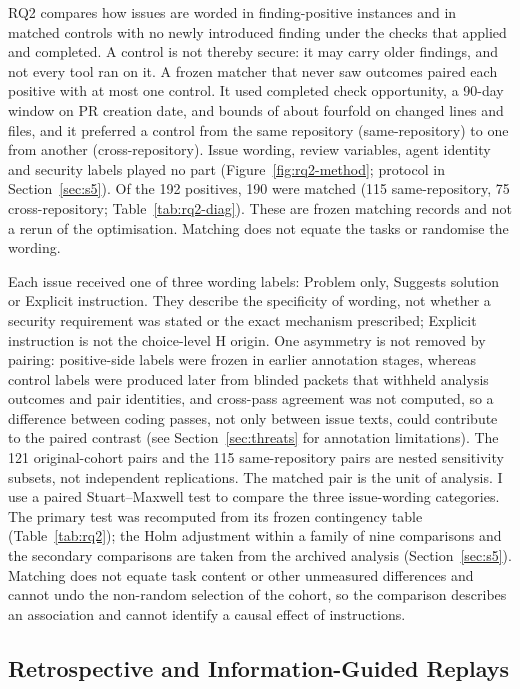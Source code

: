 \documentclass[acmsmall,screen,nonacm]{acmart}
\begin{document}
RQ2 compares how issues are worded in finding-positive instances and in matched controls with no newly introduced finding under the checks that applied and completed. A control is not thereby secure: it may carry older findings, and not every tool ran on it. A frozen matcher that never saw outcomes paired each positive with at most one control. It used completed check opportunity, a 90-day window on PR creation date, and bounds of about fourfold on changed lines and files, and it preferred a control from the same repository (same-repository) to one from another (cross-repository). Issue wording, review variables, agent identity and security labels played no part (Figure~\ref{fig:rq2-method}; protocol in Section~\ref{sec:s5}). Of the 192 positives, 190 were matched (115 same-repository, 75 cross-repository; Table~\ref{tab:rq2-diag}). These are frozen matching records and not a rerun of the optimisation. Matching does not equate the tasks or randomise the wording.

Each issue received one of three wording labels: Problem only, Suggests solution or Explicit instruction. They describe the specificity of wording, not whether a security requirement was stated or the exact mechanism prescribed; Explicit instruction is not the choice-level H origin. One asymmetry is not removed by pairing: positive-side labels were frozen in earlier annotation stages, whereas control labels were produced later from blinded packets that withheld analysis outcomes and pair identities, and cross-pass agreement was not computed, so a difference between coding passes, not only between issue texts, could contribute to the paired contrast (see Section~\ref{sec:threats} for annotation limitations). The 121 original-cohort pairs and the 115 same-repository pairs are nested sensitivity subsets, not independent replications. The matched pair is the unit of analysis. I use a paired Stuart--Maxwell test to compare the three issue-wording categories. The primary test was recomputed from its frozen contingency table (Table~\ref{tab:rq2}); the Holm adjustment within a family of nine comparisons and the secondary comparisons are taken from the archived analysis (Section~\ref{sec:s5}). Matching does not equate task content or other unmeasured differences and cannot undo the non-random selection of the cohort, so the comparison describes an association and cannot identify a causal effect of instructions.

\subsection{Retrospective and Information-Guided Replays}\label{sec:rq3-design}
\end{document}
